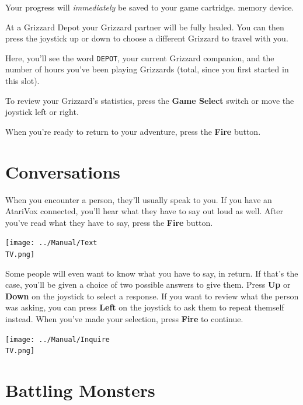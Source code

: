 \documentclass[10pt,twocolumn,openany,article]{memoir}
\newcommand\TV{NTSC}
\newcommand\TV{PAL}
\newcommand\TV{SECAM}
\begin{document}
\ifdefined\NOSAVE\else Your progress will \emph{immediately} be saved to
your \ifdefined\ATARIAGESAVE  game cartridge.  \else memory  device. \fi
\fi

At  a  Grizzard  Depot  your  Grizzard partner  will  be  fully  healed.
\ifdefined\NOSAVE\else You  can then  press the joystick  up or  down to
choose a different Grizzard to travel with you. \fi

Here,  you'll  see  the   word  \texttt{DEPOT},  your  current  Grizzard
companion, and the number of hours you've been playing Grizzards (total,
since you first started in this slot).

To   review  your   Grizzard's   statistics,   press  the   \textbf{Game
  Select} switch or move the joystick left or right.

When   you're   ready  to   return   to   your  adventure,   press   the
\textbf{Fire} button.

\section{Conversations}

When you encounter  a person, they'll usually speak to  you. If you have
an AtariVox  connected, you'll hear  what they have  to say out  loud as
well.   After  you've   read  what   they   have  to   say,  press   the
\textbf{Fire} button.

\begin{center}
  \texttt{[image: ../Manual/Text\\TV.png]}
\end{center}

Some people  will even  want to know  what you have  to say,  in return.
If that's the case, you'll be given  a choice of two possible answers to
give them. Press \textbf{Up} or  \textbf{Down} on the joystick to select
a response. If  you want to review  what the person was  asking, you can
press   \textbf{Left}  on   the   joystick  to   ask   them  to   repeat
themself instead.  When you've made your  selection, press \textbf{Fire}
to continue.

\begin{center}
  \texttt{[image: ../Manual/Inquire\\TV.png]}
\end{center}

\section{Battling Monsters}
\end{document}
